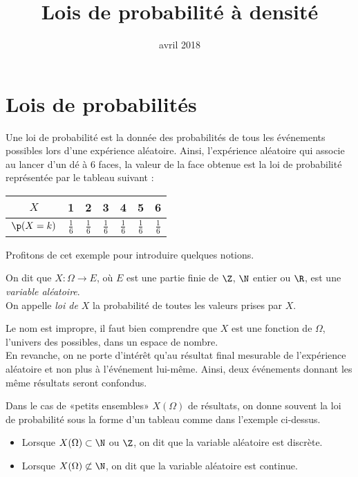 \documentclass[12pt,a4paper,french]{article}
\title{Lois de probabilité à densité}
\author{\bsc{Jumel}}
\date{avril 2018}
\begin{document}
\maketitle

\bigskip

\section{Lois de probabilités}

Une loi de probabilité est la donnée des probabilités de tous les événements
possibles lors d'une expérience aléatoire. Ainsi, l'expérience aléatoire qui
associe au lancer d'un dé à 6 faces, la valeur de la face obtenue est la loi
de probabilité représentée par le tableau suivant :
\begin{center}
  \begin{tabular}{|*{7}{c|}}\hline
    $X$ & 1 & 2 & 3 & 4 & 5 & 6 \\ \hline
    $\p(X = k)$ & $\frac16$ & $\frac16$ & $\frac16$ & $\frac16$ & $\frac16$
                & $\frac16$ \\ \hline
  \end{tabular}
\end{center}
Profitons de cet exemple pour introduire quelques notions.
\begin{definition}
  On dit que $X \colon \Omega \to E$, où $E$ est une partie finie de
  $\Z$, $\N$ entier ou $\R$, est une \emph{variable aléatoire}.\\ On appelle
  \emph{loi de $X$} la probabilité de toutes les valeurs prises par $X$.
\end{definition}

\begin{remarque}
  Le nom est impropre, il faut bien comprendre que $X$ est une fonction de
  $\Omega$, l'univers des possibles, dans un espace de nombre.\\
  En revanche, on ne porte d'intérêt qu'au résultat final mesurable de
  l'expérience aléatoire et non plus à l'événement lui-même. Ainsi, deux
  événements donnant les même résultats seront confondus.
\end{remarque}
Dans le cas de «petits ensembles» $X(\Omega)$ de résultats, on donne souvent
la loi de probabilité sous la forme d'un tableau comme dans l'exemple
ci-dessus.
\begin{definition}
  \begin{itemize}
    \item Lorsque $X(\Omega) \subset \N$ ou $\Z$, on dit que la variable
      aléatoire est discrète.
    \item Lorsque $X(\Omega) \not\subset \N$, on dit que la variable
      aléatoire est continue.
  \end{itemize}
\end{definition}
\end{document}
